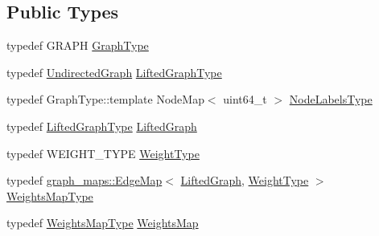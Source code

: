 \subsection*{Public Types}
\begin{DoxyCompactItemize}
\item 
typedef G\+R\+A\+PH \hyperlink{classnifty_1_1graph_1_1opt_1_1lifted__multicut_1_1LiftedMulticutObjective_a29cf21c14a4ffdb1f8697d535c3d458e}{Graph\+Type}
\item 
typedef \hyperlink{classnifty_1_1graph_1_1UndirectedGraph}{Undirected\+Graph} \hyperlink{classnifty_1_1graph_1_1opt_1_1lifted__multicut_1_1LiftedMulticutObjective_aec5a5f52c2226c545ca883394fd95a9c}{Lifted\+Graph\+Type}
\item 
typedef Graph\+Type\+::template Node\+Map$<$ uint64\+\_\+t $>$ \hyperlink{classnifty_1_1graph_1_1opt_1_1lifted__multicut_1_1LiftedMulticutObjective_a91fb5072dcc3fed27bf41202babca545}{Node\+Labels\+Type}
\item 
typedef \hyperlink{classnifty_1_1graph_1_1opt_1_1lifted__multicut_1_1LiftedMulticutObjective_aec5a5f52c2226c545ca883394fd95a9c}{Lifted\+Graph\+Type} \hyperlink{classnifty_1_1graph_1_1opt_1_1lifted__multicut_1_1LiftedMulticutObjective_a560fc2d21604ab9e3e23496d47839ff9}{Lifted\+Graph}
\item 
typedef W\+E\+I\+G\+H\+T\+\_\+\+T\+Y\+PE \hyperlink{classnifty_1_1graph_1_1opt_1_1lifted__multicut_1_1LiftedMulticutObjective_a75ee804d11d3547f9985816c6805e6a8}{Weight\+Type}
\item 
typedef \hyperlink{structnifty_1_1graph_1_1graph__maps_1_1EdgeMap}{graph\+\_\+maps\+::\+Edge\+Map}$<$ \hyperlink{classnifty_1_1graph_1_1opt_1_1lifted__multicut_1_1LiftedMulticutObjective_a560fc2d21604ab9e3e23496d47839ff9}{Lifted\+Graph}, \hyperlink{classnifty_1_1graph_1_1opt_1_1lifted__multicut_1_1LiftedMulticutObjective_a75ee804d11d3547f9985816c6805e6a8}{Weight\+Type} $>$ \hyperlink{classnifty_1_1graph_1_1opt_1_1lifted__multicut_1_1LiftedMulticutObjective_a305e842978db90f9b1d68e4b06240373}{Weights\+Map\+Type}
\item 
typedef \hyperlink{classnifty_1_1graph_1_1opt_1_1lifted__multicut_1_1LiftedMulticutObjective_a305e842978db90f9b1d68e4b06240373}{Weights\+Map\+Type} \hyperlink{classnifty_1_1graph_1_1opt_1_1lifted__multicut_1_1LiftedMulticutObjective_ab4bdcf27ce49303201bb4332db89a78c}{Weights\+Map}
\end{DoxyCompactItemize}
